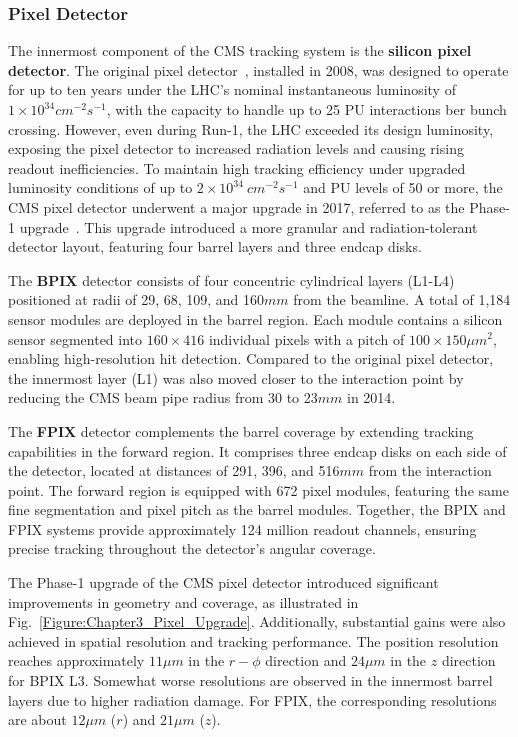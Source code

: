 \newpage
\subsubsection{Pixel Detector}

The innermost component of the CMS tracking system is the \textbf{silicon pixel detector}. The original pixel detector~\cite{LHC_CMS}, installed in 2008, was designed to operate for up to ten years under the LHC’s nominal instantaneous luminosity of $1 \times 10^{34}\unit{cm}^{-2}\unit{s}^{-1}$, with the capacity to handle up to 25 PU interactions ber bunch crossing. However, even during Run-1, the LHC exceeded its design luminosity, exposing the pixel detector to increased radiation levels and causing rising readout inefficiencies. To maintain high tracking efficiency under upgraded luminosity conditions of up to $2 \times 10^{34}~\unit{cm}^{-2}\unit{s}^{-1}$ and PU levels of 50 or more, the CMS pixel detector underwent a major upgrade in 2017, referred to as the Phase-1 upgrade~\cite{CMS_Detector_Run3, CMS_Tracker_Phase1_Upgrade,CMS_Tracker_Phase1_Upgrade_2}. This upgrade introduced a more granular and radiation-tolerant detector layout, featuring four barrel layers and three endcap disks.

The \textbf{\ac{BPIX}} detector consists of four concentric cylindrical layers (L1-L4) positioned at radii of 29, 68, 109, and 160$\unit{mm}$ from the beamline. A total of 1,184 sensor modules are deployed in the barrel region. Each module contains a silicon sensor segmented into $160 \times 416$ individual pixels with a pitch of $100 \times 150\unit{\mu m}^2$, enabling high-resolution hit detection. Compared to the original pixel detector, the innermost layer (L1) was also moved closer to the interaction point by reducing the CMS beam pipe radius from 30 to 23$\unit{mm}$ in 2014. 

The \textbf{\ac{FPIX}} detector complements the barrel coverage by extending tracking capabilities in the forward region. It comprises three endcap disks on each side of the detector, located at distances of 291, 396, and 516$\unit{mm}$ from the interaction point. The forward region is equipped with 672 pixel modules, featuring the same fine segmentation and pixel pitch as the barrel modules. Together, the BPIX and FPIX systems provide approximately 124 million readout channels, ensuring precise tracking throughout the detector’s angular coverage.

The Phase-1 upgrade of the CMS pixel detector introduced significant improvements in geometry and coverage, as illustrated in Fig.~\ref{Figure:Chapter3_Pixel_Upgrade}. Additionally, substantial gains were also achieved in spatial resolution and tracking performance. The position resolution reaches approximately $11\unit{\mu m}$ in the $r-\phi$ direction and $24\unit{\mu m}$ in the $z$ direction for BPIX L3. Somewhat worse resolutions are observed in the innermost barrel layers due to higher radiation damage. For FPIX, the corresponding resolutions are about $12\unit{\mu m}$ ($r$) and $21\unit{\mu m}$ ($z$). 

